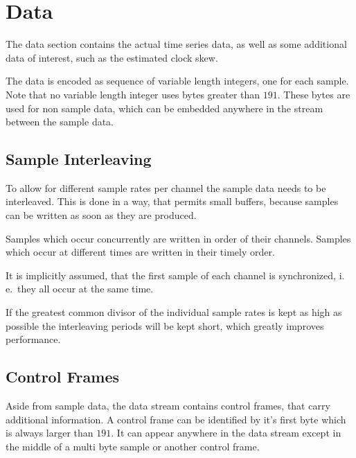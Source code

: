 \documentclass[DIV=10]{scrartcl}
\begin{document}
\section{Data}

The data section contains the actual time series data, as well as some additional data of interest, such as the estimated clock skew.

The data is encoded as sequence of variable length integers, one for each sample.
Note that no variable length integer uses bytes greater than \(191\).
These bytes are used for non sample data, which can be embedded anywhere in the stream between the sample data.

\subsection{Sample Interleaving}

To allow for different sample rates per channel the sample data needs to be interleaved.
This is done in a way, that permits small buffers, because samples can be written as soon as they are produced.

Samples which occur concurrently are written in order of their channels.
Samples which occur at different times are written in their timely order.

It is implicitly assumed, that the first sample of each channel is synchronized, i.\,e.\ they all occur at the same time.

If the greatest common divisor of the individual sample rates is kept as high as possible the interleaving periods will be kept short, which greatly improves performance.

\subsection{Control Frames}

Aside from sample data, the data stream contains control frames, that carry additional information.
A control frame can be identified by it’s first byte which is always larger than \(191\).
It can appear anywhere in the data stream except in the middle of a multi byte sample or another control frame.
\end{document}
